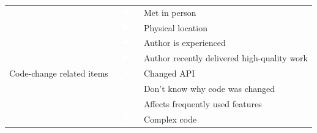 \begin{table}[t!]
\begin{tabular}{rll}
&\vspace{-2pt}\includegraphics[height=10px, width=30px]{figures/sparkles/met-change-author-in-person.pdf} & Met in person\\
&\vspace{-2pt}\includegraphics[height=10px, width=30px]{figures/sparkles/physical-location-of-the-change-author.pdf} & Physical location\\
&\vspace{-2pt}\includegraphics[height=10px, width=30px]{figures/sparkles/change-author-is-experienced.pdf} & Author is experienced\\
&\vspace{-2pt}\includegraphics[height=10px, width=30px]{figures/sparkles/recent-work-of-high-quality.pdf} & Author recently delivered high-quality work\\
\midrule
Code-change related items&\vspace{-2pt}\includegraphics[height=10px, width=30px]{figures/sparkles/change-modified-API.pdf} & Changed API\\
&\vspace{-2pt}\includegraphics[height=10px, width=30px]{figures/sparkles/don-t-know-why-code-was-changed.pdf} & Don't know why code was changed\\
&\vspace{-2pt}\includegraphics[height=10px, width=30px]{figures/sparkles/code-affects-frequently-used-features.pdf} & Affects frequently used features\\
&\vspace{-2pt}\includegraphics[height=10px, width=30px]{figures/sparkles/complex-code-was-changed.pdf} & Complex code\\

\end{tabular}
\end{table}
